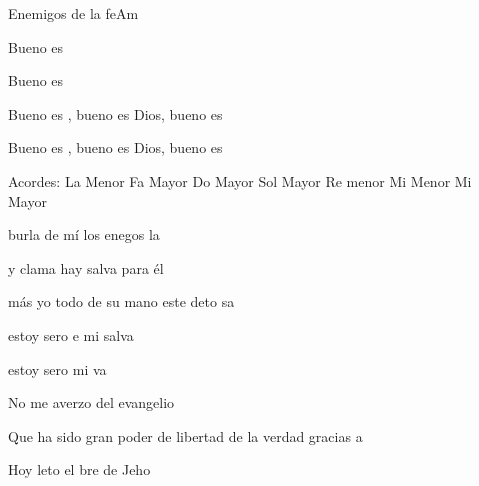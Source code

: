 \documentclass[12pt, spanish]{book}
\begin{document}
\begin{song}{Enemigos de la fe}{Am}
        \begin{SBOpGroup}
            Bueno es 

            Bueno es 

            Bueno es , bueno es Dios, bueno es 

            Bueno es , bueno es Dios, bueno es 
        \end{SBOpGroup}

        \ifChordBk
        \begin{SBOpGroup}
            Acordes:\break
            \upchord{\Am}\qquad La Menor \hfill
            \upchord{\F}\qquad Fa Mayor \hfill\null\break
            \upchord{\C}\qquad Do Mayor  \hfill
            \upchord{\G}\qquad Sol Mayor \hfill
            \upchord{\Dm}\qquad Re menor  \hfill\null\break
            \upchord{\Em}\qquad Mi Menor \hfill
            \upchord{\E}\qquad Mi Mayor \hfill\null\break
        \end{SBOpGroup}
        \fi
        \begin{SBExtraKeys}{

            \begin{SBOpGroup}
                 burla de mí los enegos  la 

                y clama  hay salva para él

                más yo todo de su mano este deto sa

                estoy sero e mi salva

                estoy sero  mi va
            \end{SBOpGroup}
            \vskip 20pt
            \begin{SBOpGroup}
                No me averzo del evangelio

                Que ha sido gran poder de libertad de la verdad gracias a 

                Hoy leto el bre de Jeho
            \end{SBOpGroup}


}
\end{SBExtraKeys}
\end{song}
\end{document}
